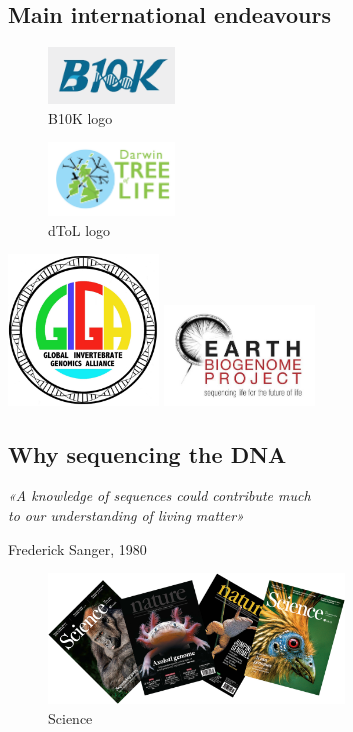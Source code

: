 \documentclass[
]{article}
\begin{document}
\hypertarget{main-international-endeavours}{%
\subsection{Main international
endeavours}\label{main-international-endeavours}}

\begin{figure}
\centering
\includegraphics[width=0.3\textwidth,height=\textheight]{../imgs/B10K_logo.png}
\caption{B10K logo}
\end{figure}

\begin{figure}
\centering
\includegraphics[width=0.3\textwidth,height=\textheight]{../imgs/dToL_logo.png}
\caption{dToL logo}
\end{figure}

\includegraphics[width=0.3\textwidth,height=\textheight]{../imgs/GIGA_logo.jpg}
\includegraphics[width=0.3\textwidth,height=\textheight]{../imgs/EBP_logo.jpg}

\hypertarget{why-sequencing-the-dna}{%
\subsection{Why sequencing the DNA}\label{why-sequencing-the-dna}}

\emph{«A knowledge of sequences could contribute much\\
to our understanding of living matter»}

Frederick Sanger, 1980

\begin{figure}
\centering
\includegraphics[width=0.7\textwidth,height=\textheight]{../imgs/science.png}
\caption{Science}
\end{figure}
\end{document}

